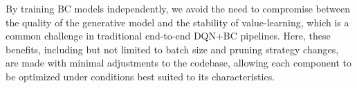 By training BC models independently, we avoid the need to compromise between the quality of the generative model and the stability of value-learning, which is a common challenge in traditional end-to-end DQN+BC pipelines. Here, these benefits, including but not limited to batch size and pruning strategy changes, are made with minimal adjustments to the codebase, allowing each component to be optimized under conditions best suited to its characteristics.  

